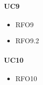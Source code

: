 \paragraph{UC9}
\quad
\begin{multicols}{3}
    \begin{itemize}
        \item RFO9
        \item RFO9.2
    \end{itemize}
\end{multicols}

\paragraph{UC10}
\quad
\begin{multicols}{3}
    \begin{itemize}
        \item RFO10
    \end{itemize}
\end{multicols}
